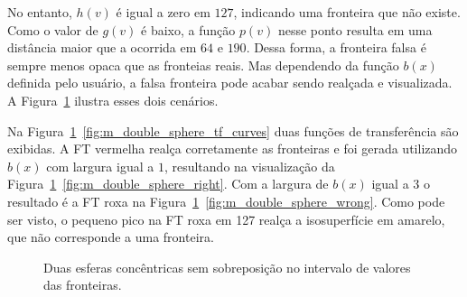 	No entanto, $ h(v) $ é igual a zero em $ 127 $, indicando uma fronteira que não existe. Como o valor de $ g(v) $ é baixo, a função $ p(v) $ nesse ponto resulta em uma distância maior que a ocorrida em $ 64 $ e $ 190 $. Dessa forma, a fronteira falsa é sempre menos opaca que as fronteias reais. Mas dependendo da função $ b(x) $ definida pelo usuário, a falsa fronteira pode acabar sendo realçada e visualizada. A Figura~\ref{fig:m_double_sphere_tf} ilustra esses dois cenários.
	
	Na Figura~\ref{fig:m_double_sphere_tf}~\ref{fig:m_double_sphere_tf_curves} duas funções de transferência são exibidas. A FT vermelha realça corretamente as fronteiras e foi gerada utilizando $ b(x) $ com largura igual a $ 1 $, resultando na visualização da Figura~\ref{fig:m_double_sphere_tf}~\ref{fig:m_double_sphere_right}. Com a largura de $ b(x) $ igual a $ 3 $ o resultado é a FT roxa na Figura~\ref{fig:m_double_sphere_tf}~\ref{fig:m_double_sphere_wrong}. Como pode ser visto, o pequeno pico na FT roxa em 127 realça a isosuperfície em amarelo, que não corresponde a uma fronteira.

\begin{figure}[h]
	\centering
	\caption{Duas esferas concêntricas sem sobreposição no intervalo de valores das fronteiras.}
	\label{fig:m_double_sphere_tf}
\end{figure}


